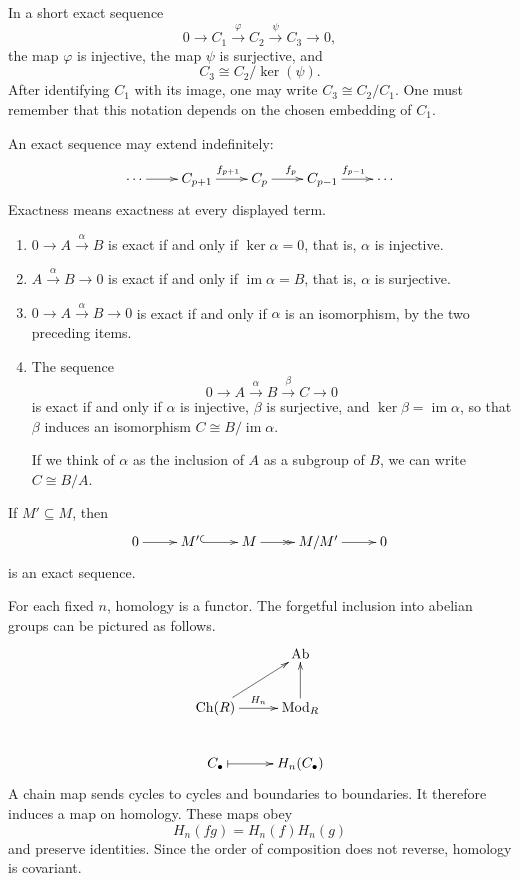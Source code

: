 \begin{proposition}
\label{at-proposition-short-exact-quotient}
In a short exact sequence
$$
0\longrightarrow C_1
\xrightarrow{\varphi}C_2
\xrightarrow{\psi}C_3
\longrightarrow0,
$$
the map $\varphi$ is injective, the map
$\psi$ is surjective, and
$$
C_3\cong C_2/\ker(\psi).
$$
After identifying $C_1$ with its image,
one may write $C_3\cong C_2/C_1$.
One must remember that this notation
depends on the chosen embedding of $C_1$.
\end{proposition}


An exact sequence may extend indefinitely:
$$
\xymatrix@C=2.2em{
\cdots \ar[r]
  & C_{p+1} \ar[r]^{f_{p+1}}
  & C_p \ar[r]^{f_p}
  & C_{p-1} \ar[r]^{f_{p-1}}
  & \cdots
}
$$
Exactness means exactness at every displayed
term.

\begin{proposition}
\label{proposition-exact-sequence-criteria}
\begin{enumerate}
\item $0\to A\xrightarrow{\alpha}B$ is exact
if and only if
$\ker\alpha=0$, that is, $\alpha$ is
injective.
\item $A\xrightarrow{\alpha}B\to0$ is exact
if and only if
$\operatorname{im}\alpha=B$, that is,
$\alpha$ is
surjective.
\item $0\to A\xrightarrow{\alpha}B\to0$ is
exact if and only
if $\alpha$ is an isomorphism, by the two
preceding items.
\item The sequence
$$
0\to A\xrightarrow{\alpha}B
\xrightarrow{\beta}C\to0
$$
is exact if and only if $\alpha$ is
injective, $\beta$ is
surjective, and
$\ker\beta=\operatorname{im}\alpha$, so that
$\beta$ induces an isomorphism $C\cong
B/\operatorname{im}\alpha$.

If we think of $\alpha$ as the inclusion of
$A$ as a subgroup
of $B$, we can write $C\cong B/A$.
\end{enumerate}
\end{proposition}

\begin{remark}
If $M'\subseteq M$, then
$$
\xymatrix{
0 \ar[r]
  & M' \ar@{^{(}->}[r]
  & M \ar@{->>}[r]
  & M/M' \ar[r]
  & 0
}
$$
is an exact sequence.
\end{remark}


\noindent
For each fixed $n$, homology is a functor.
The forgetful inclusion into abelian groups
can be pictured as follows.
$$
\xymatrix{
  & \operatorname{Ab} \\
\operatorname{Ch}(R)
  \ar[r]^-{H_n}
  \ar[ur]
  & \operatorname{Mod}_R \ar[u] \\
C_\bullet \ar@{|->}[r]
  & H_n(C_\bullet)
}
$$
A chain map sends cycles to cycles and
boundaries to boundaries.  It therefore
induces a map on homology.  These maps obey
$$
H_n(fg)=H_n(f)H_n(g)
$$
and preserve identities.  Since the order
of composition does not reverse, homology
is covariant.

